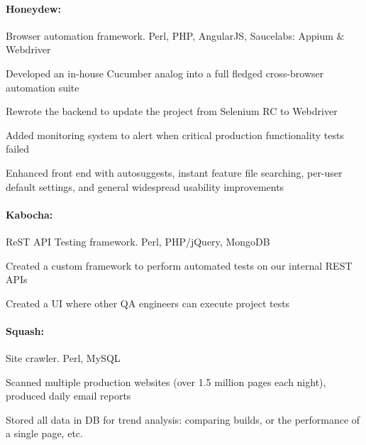\begin{position}

  \paragraph{Honeydew:} Browser automation framework. Perl, PHP, AngularJS, Saucelabs: Appium \& Webdriver
  \begin{myitem}
  \item Developed an in-house Cucumber analog into a full fledged cross-browser automation suite
  \item Rewrote the backend to update the project from Selenium RC to Webdriver
  \item Added monitoring system to alert when critical production functionality tests failed
  \item Enhanced front end with autosuggests, instant feature file searching, per-user default
    settings, and general widespread usability improvements
  \end{myitem}
  \paragraph{Kabocha:} ReST API Testing framework. Perl, PHP/jQuery, MongoDB
  \begin{myitem}
  \item Created a custom framework to perform automated tests on our internal REST APIs
  \item Created a UI where other QA engineers can execute project tests
  \end{myitem}

  \paragraph{Squash:} Site crawler. Perl, MySQL
  \begin{myitem}
  \item Scanned multiple production websites (over 1.5 million pages each night), produced daily email reports
  \item Stored all data in DB for trend analysis: comparing builds, or the performance of a single page, etc.
  \end{myitem}

\end{position}
